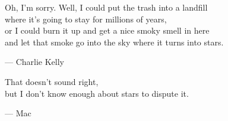 \begin{flushright}
\begin{hangleftquote}{\QENOpen}{\QENClose}
Oh, I'm sorry. Well, I could put the trash into a landfill\\
where it's going to stay for millions of years,\\
or I could burn it up and get a nice smoky smell in here\\
and let that smoke go into the sky where it turns into stars.
\end{hangleftquote}
\par\smallskip
\normalfont — Charlie Kelly
\end{flushright}

\vspace{2em}

\begin{flushright}
\begin{hangleftquote}{\QENOpen}{\QENClose}
That doesn't sound right,\\
but I don't know enough about stars to dispute it.
\end{hangleftquote}
\par\smallskip
\normalfont — Mac
\end{flushright}

